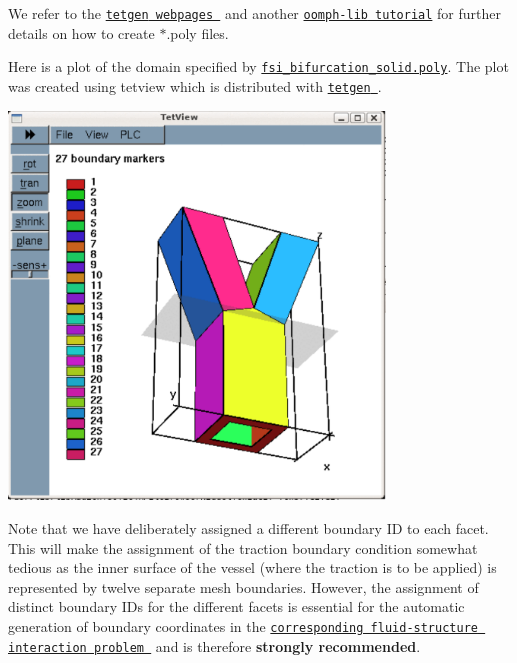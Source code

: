 We refer to the \href{http://wias-berlin.de/software/tetgen//}{\tt {\ttfamily tetgen} webpages } and another \href{../../../meshes/mesh_from_tetgen/html/index.html}{\tt {\ttfamily oomph-\/lib} tutorial} for further details on how to create {\ttfamily $\ast$.poly} files.

Here is a plot of the domain specified by \href{../../../../demo_drivers/solid/unstructured_three_d_solid/fsi_bifurcation_solid.poly}{\tt fsi\+\_\+bifurcation\+\_\+solid.\+poly}. The plot was created using {\ttfamily tetview} which is distributed with \href{http://wias-berlin.de/software/tetgen//}{\tt {\ttfamily tetgen} }.

 
\begin{DoxyImage}
\includegraphics[width=0.75\textwidth]{tetgen_boundaries}
\end{DoxyImage}


Note that we have deliberately assigned a different boundary ID to each facet. This will make the assignment of the traction boundary condition somewhat tedious as the inner surface of the vessel (where the traction is to be applied) is represented by twelve separate mesh boundaries. However, the assignment of distinct boundary I\+Ds for the different facets is essential for the automatic generation of boundary coordinates in the \href{../../../interaction/unstructured_three_d_fsi/html/index.html}{\tt corresponding fluid-\/structure interaction problem } and is therefore {\bfseries strongly recommended}.

